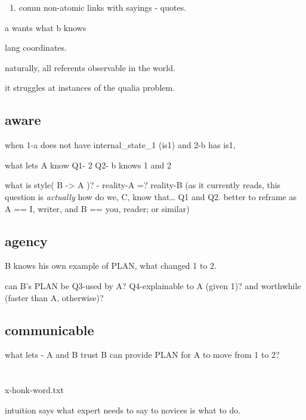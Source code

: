 \documentclass[
]{book}
\providecommand{\tightlist}{%
  \setlength{\itemsep}{0pt}\setlength{\parskip}{0pt}}
\begin{document}
\begin{enumerate}
\def\labelenumi{\arabic{enumi}.}
\tightlist
\item
  comm non-atomic links with sayings - quotes.
\end{enumerate}

a wants what b knows

lang coordinates.

naturally, all referents observable in the world.

it struggles at instances of the qualia problem.

\hypertarget{aware}{%
\subsection{aware}\label{aware}}

when
1-a does not have internal\_state\_1 (is1) and
2-b has is1,

what lets A know
Q1- 2
Q2- b knows 1 and 2

what is style( B -\textgreater{} A )?
- reality-A =? reality-B
(as it currently reads, this question is \emph{actually} how do we, C, know that\ldots{} Q1 and Q2. better to reframe as A == I, writer, and B == you, reader; or similar)

\hypertarget{agency}{%
\subsection{agency}\label{agency}}

B knows his own example of
PLAN, what changed 1 to 2.

can B's PLAN be
Q3-used by A?
Q4-explainable to A (given 1)?
and worthwhile (faster than A, otherwise)?

\hypertarget{communicable}{%
\subsection{communicable}\label{communicable}}

what lets
- A and B trust B can provide PLAN for A to move from 1 to 2?

\hypertarget{section}{%
\section{}\label{section}}

x-honk-word.txt

intuition says what
expert needs to say to
novices is
what to do.
\end{document}
